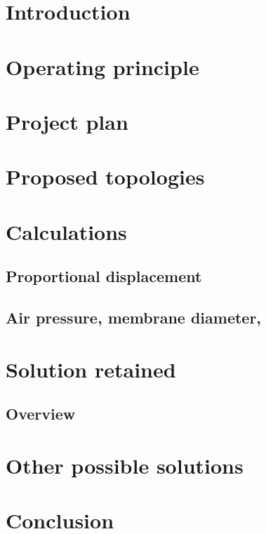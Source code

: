 \section*{Introduction} 



\section{Operating principle}


\section{Project plan}

\section{Proposed topologies}

\section{Calculations}
\subsection{Proportional displacement}

\subsection{Air pressure, membrane diameter, }




\section{Solution retained}
\subsection{Overview}

\section{Other possible solutions}

\section{Conclusion}


\pagebreak



\pagebreak
\appendix



